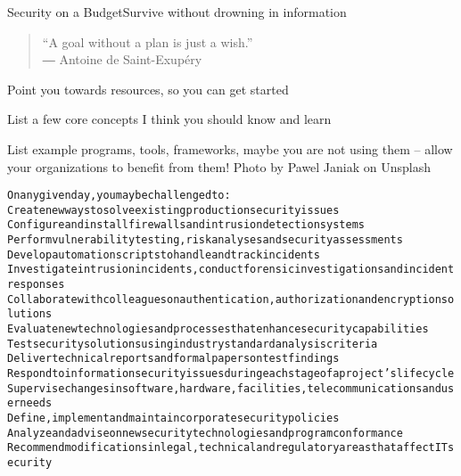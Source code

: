 \documentclass[Screen16to9,17pt]{foils}
\begin{document}
{}

\mytitlepage
{Security on a Budget}{Survive without drowning in information}

\hlkprofiluk




\begin{quote}
  “A goal without a plan is just a wish.”\\
  ― Antoine de Saint-Exupéry
\end{quote}




\begin{list1}
\item Point you towards resources, so you can get started
\item List a few core concepts I think you should know and learn
\item List example programs, tools, frameworks, maybe you are not using them -- allow your organizations to benefit from them!
\hskip 2cm {\footnotesize Photo by Pawel Janiak on Unsplash}
\end{list1}



\begin{alltt}\small
On any given day, you may be challenged to:
        Create new ways to solve existing production security issues
        Configure and install firewalls and intrusion detection systems
        Perform vulnerability testing, risk analyses and security assessments
        Develop automation scripts to handle and track incidents
        Investigate intrusion incidents, conduct forensic investigations and incident responses
        Collaborate with colleagues on authentication, authorization and encryption solutions
        Evaluate new technologies and processes that enhance security capabilities
        Test security solutions using industry standard analysis criteria
        Deliver technical reports and formal papers on test findings
        Respond to information security issues during each stage of a project’s lifecycle
        Supervise changes in software, hardware, facilities, telecommunications and user needs
        Define, implement and maintain corporate security policies
        Analyze and advise on new security technologies and program conformance
        Recommend modifications in legal, technical and regulatory areas that affect IT security
\end{alltt}
\end{document}
